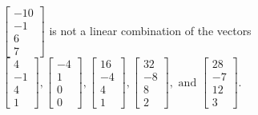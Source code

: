 \begin{exercise}
\begin{exerciseStatement}
  \end{exerciseStatement}
  \begin{exerciseAnswer}
   \(\left[\begin{array}{c}
-10 \\
-1 \\
6 \\
7
\end{array}\right]\) 
  	 is not  
	a linear combination of the vectors \(\left[\begin{array}{c}
4 \\
-1 \\
4 \\
1
\end{array}\right] , \left[\begin{array}{c}
-4 \\
1 \\
0 \\
0
\end{array}\right] , \left[\begin{array}{c}
16 \\
-4 \\
4 \\
1
\end{array}\right] , \left[\begin{array}{c}
32 \\
-8 \\
8 \\
2
\end{array}\right] , \text{ and } \left[\begin{array}{c}
28 \\
-7 \\
12 \\
3
\end{array}\right]\).

	
  


  \end{exerciseAnswer}
\end{exercise}